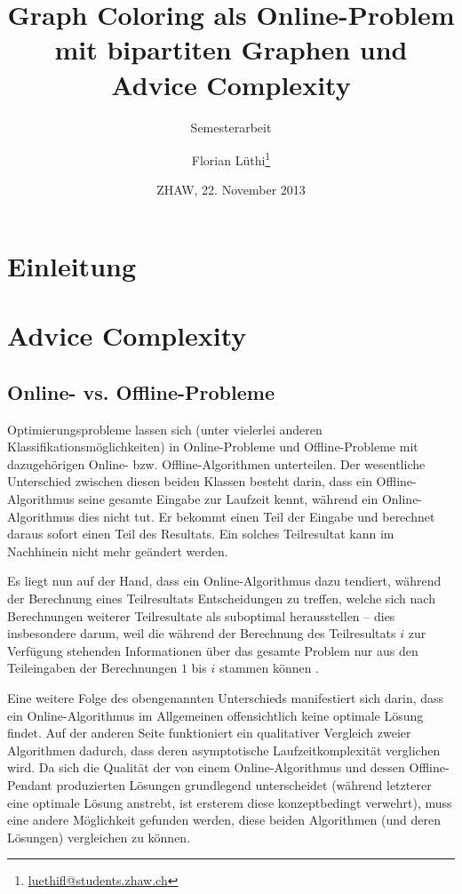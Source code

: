 \documentclass[11pt]{scrreprt} %
\title{Graph Coloring als Online-Problem mit bipartiten Graphen und Advice Complexity}
\subtitle{Semesterarbeit}
\author{Florian Lüthi\footnote{\url{luethifl@students.zhaw.ch}}}
\date{ZHAW, 22. November 2013} %
\theoremstyle{definition}
\begin{document}
\maketitle

\tableofcontents

\chapter{Einleitung}


\chapter{Advice Complexity}

\section{Online- vs. Offline-Probleme}

Optimierungsprobleme lassen sich (unter vielerlei anderen Klassifikationsmöglichkeiten) in Online-Probleme und Offline-Probleme mit dazugehörigen Online- bzw. Offline-Algo\-rithmen unterteilen. Der wesentliche Unterschied zwischen diesen beiden Klassen besteht darin, dass ein Offline-Algorithmus seine gesamte Eingabe zur Laufzeit kennt, während ein Online-Algorithmus dies nicht tut. Er bekommt einen Teil der Eingabe und berechnet daraus sofort einen Teil des Resultats. Ein solches Teilresultat kann im Nachhinein nicht mehr geändert werden.

Es liegt nun auf der Hand, dass ein Online-Algorithmus dazu tendiert, während der Berechnung eines Teilresultats Entscheidungen zu treffen, welche sich nach Berechnungen weiterer Teilresultate als suboptimal herausstellen -- dies insbesondere darum, weil die während der Berechnung des Teilresultats $i$ zur Verfügung stehenden Informationen über das gesamte Problem nur aus den Teileingaben der Berechnungen $1$ bis $i$ stammen können \cite{BKK}.

\bigskip
Eine weitere Folge des obengenannten Unterschieds manifestiert sich darin, dass ein Online-Algorithmus im Allgemeinen offensichtlich keine optimale Lösung findet. Auf der anderen Seite funktioniert ein qualitativer Vergleich zweier Algorithmen dadurch, dass deren asymptotische Laufzeitkomplexität verglichen wird. Da sich die Qualität der von einem Online-Algorithmus und dessen Offline-Pendant produzierten Lösungen grundlegend unterscheidet (während letzterer eine optimale Lösung anstrebt, ist ersterem diese konzeptbedingt verwehrt), muss eine andere Möglichkeit gefunden werden, diese beiden Algorithmen (und deren Lösungen) vergleichen zu können.
\end{document}
